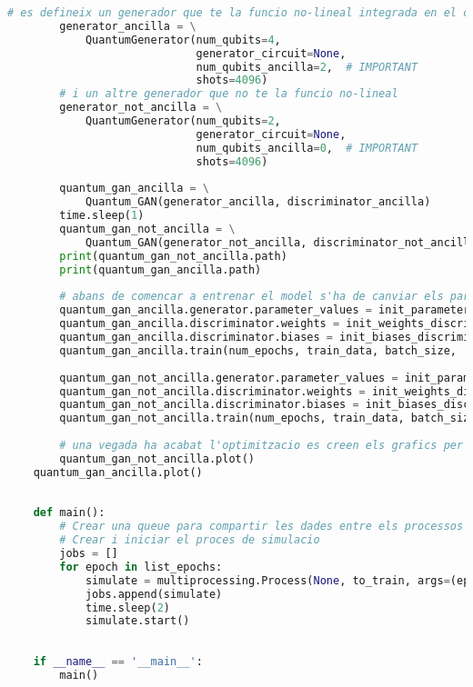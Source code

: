 \begin{lstlisting}[language=Python, caption=Executar els models amb multiprocessing]
		# es defineix un generador que te la funcio no-lineal integrada en el circuit
		generator_ancilla = \
			QuantumGenerator(num_qubits=4,
						  	 generator_circuit=None,
							 num_qubits_ancilla=2,  # IMPORTANT
						 	 shots=4096)
		# i un altre generador que no te la funcio no-lineal
		generator_not_ancilla = \
			QuantumGenerator(num_qubits=2,
	                         generator_circuit=None,
							 num_qubits_ancilla=0,  # IMPORTANT
							 shots=4096)
	
		quantum_gan_ancilla = \
			Quantum_GAN(generator_ancilla, discriminator_ancilla)
		time.sleep(1)
		quantum_gan_not_ancilla = \
			Quantum_GAN(generator_not_ancilla, discriminator_not_ancilla)
		print(quantum_gan_not_ancilla.path)
		print(quantum_gan_ancilla.path)
	
		# abans de comencar a entrenar el model s'ha de canviar els parametres als definits anteriorment
		quantum_gan_ancilla.generator.parameter_values = init_parameters_ancilla
		quantum_gan_ancilla.discriminator.weights = init_weights_discriminator
		quantum_gan_ancilla.discriminator.biases = init_biases_discriminator
		quantum_gan_ancilla.train(num_epochs, train_data, batch_size, .1, .1, False)
	
		quantum_gan_not_ancilla.generator.parameter_values = init_parameters_not_ancilla
		quantum_gan_not_ancilla.discriminator.weights = init_weights_discriminator
		quantum_gan_not_ancilla.discriminator.biases = init_biases_discriminator
		quantum_gan_not_ancilla.train(num_epochs, train_data, batch_size, .1, .1, False)
	
		# una vegada ha acabat l'optimitzacio es creen els grafics per compara l'eficiencia del models
		quantum_gan_not_ancilla.plot()
	quantum_gan_ancilla.plot()
	
	
	def main():
		# Crear una queue para compartir les dades entre els processos
		# Crear i iniciar el proces de simulacio
		jobs = []
		for epoch in list_epochs:
			simulate = multiprocessing.Process(None, to_train, args=(epoch,))
			jobs.append(simulate)
			time.sleep(2)
			simulate.start()
	
	
	if __name__ == '__main__':
		main()
\end{lstlisting}
